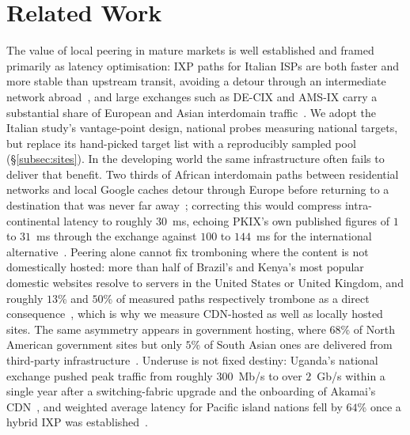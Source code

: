 \documentclass[sigconf,anonymous,10pt]{acmart}
\begin{document}


\section{Related Work}
\label{sec:related-work}
The value of local peering in mature markets is well established and framed primarily as latency optimisation: IXP paths for Italian ISPs are both faster and more stable than upstream transit, avoiding a detour through an intermediate network abroad~\cite{dibartolomeo2015}, and large exchanges such as DE-CIX and AMS-IX carry a substantial share of European and Asian interdomain traffic~\cite{ager2012, chatzis2013}. We adopt the Italian study's vantage-point design, national probes measuring national targets, but replace its hand-picked target list with a reproducibly sampled pool (\S\ref{subsec:sites}). In the developing world the same infrastructure often fails to deliver that benefit. Two thirds of African interdomain paths between residential networks and local Google caches detour through Europe before returning to a destination that was never far away~\cite{gupta2014}; correcting this would compress intra-continental latency to roughly 30~ms, echoing PKIX's own published figures of $1$ to $31$~ms through the exchange against $100$ to $144$~ms for the international alternative~\cite{pta2026}. Peering alone cannot fix tromboning where the content is not domestically hosted: more than half of Brazil's and Kenya's most popular domestic websites resolve to servers in the United States or United Kingdom, and roughly $13$\% and $50$\% of measured paths respectively trombone as a direct consequence~\cite{edmundson2016characterizing}, which is why we measure CDN-hosted as well as locally hosted sites. The same asymmetry appears in government hosting, where $68$\% of North American government sites but only $5$\% of South Asian ones are delivered from third-party infrastructure~\cite{kumar2024choices}. Underuse is not fixed destiny: Uganda's national exchange pushed peak traffic from roughly $300$~Mb/s to over $2$~Gb/s within a single year after a switching-fabric upgrade and the onboarding of Akamai's CDN~\cite{obriain2017rebuilding}, and weighted average latency for Pacific island nations fell by $64$\% once a hybrid IXP was established~\cite{lui2021costings}.
\end{document}
